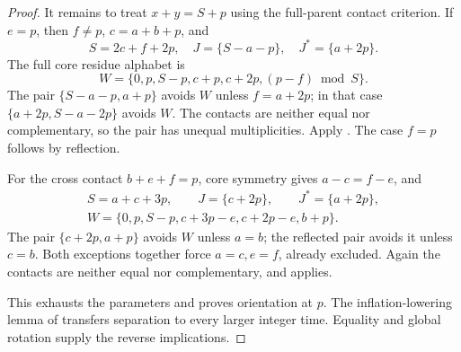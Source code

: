 \documentclass[11pt,a4paper]{amsart}
\numberwithin{equation}{section}
\theoremstyle{plain}
\theoremstyle{definition}
\begin{document}
\begin{proof}
It remains to treat \(x+y=S+p\) using the full-parent contact criterion.  If \(e=p\), then \(f\ne p\), \(c=a+b+p\), and
\[
 S=2c+f+2p,\quad J=\{S-a-p\},\quad J^*=\{a+2p\}.
\]
The full core residue alphabet is
\[
 W=\{0,p,S-p,c+p,c+2p,(p-f)\bmod S\}.
\]
The pair \(\{S-a-p,a+p\}\) avoids \(W\) unless \(f=a+2p\); in that case \(\{a+2p,S-a-2p\}\) avoids \(W\).  The contacts are neither equal nor complementary, so the pair has unequal multiplicities.  Apply .  The case \(f=p\) follows by reflection.

For the cross contact \(b+e+f=p\), core symmetry gives \(a-c=f-e\), and
\[
 \begin{gathered}
 S=a+c+3p,\qquad J=\{c+2p\},\qquad J^*=\{a+2p\},\\
 W=\{0,p,S-p,c+3p-e,c+2p-e,b+p\}.
 \end{gathered}
\]
The pair \(\{c+2p,a+p\}\) avoids \(W\) unless \(a=b\); the reflected pair avoids it unless \(c=b\).  Both exceptions together force \(a=c,e=f\), already excluded.  Again the contacts are neither equal nor complementary, and  applies.

This exhausts the parameters and proves orientation at \(p\).  The inflation-lowering lemma of \cite{Shields2026Inflation} transfers separation to every larger integer time.  Equality and global rotation supply the reverse implications.
\end{proof}
\end{document}
